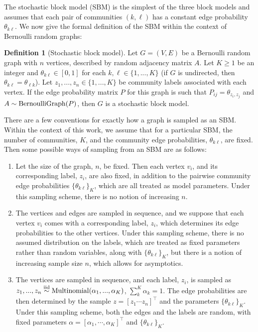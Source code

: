 \documentclass[
  12pt,
]{article}
\theoremstyle{definition}
\newtheorem{definition}{Definition}[section]
\theoremstyle{definition}
\theoremstyle{definition}
\theoremstyle{definition}
\theoremstyle{remark}
\begin{document}
The stochastic block model (SBM) \citep{doi:10.1080/0022250X.1971.9989788} is the simplest of the three block models and assumes that each pair of communities \((k, \ell)\) has a constant edge probability \(\theta_{k \ell}\).
We now give the formal definition of the SBM within the context of Bernoulli random graphs:

\begin{definition}[Stochastic block model]
\label{def:sbm}
Let $G = (V, E)$ be a Bernoulli random graph with $n$ vertices, described by random adjacency matrix $A$. 
Let $K \geq 1$ be an integer and $\theta_{k \ell} \in [0, 1]$ for each $k, \ell \in \{1, ..., K\}$ (if $G$ is undirected, then $\theta_{k \ell} = \theta_{\ell k}$). 
Let $z_1, ..., z_n \in \{1, ..., K\}$ be community labels associated with each vertex. 
If the edge probability matrix $P$ for this graph is such that 
$P_{ij} = \theta_{z_i, z_j}$ and $A \sim \mathrm{BernoulliGraph}(P)$, then $G$ is a stochastic block model. 
\end{definition}

There are a few conventions for exactly how a graph is sampled as an SBM.
Within the context of this work, we assume that for a particular SBM, the number of communities, \(K\), and the community edge probabilities, \(\theta_{k \ell}\), are fixed.
Then some possible ways of sampling from an SBM are as follows:

\begin{enumerate}
\def\labelenumi{\arabic{enumi}.}
\item
  Let the size of the graph, \(n\), be fixed.
  Then each vertex \(v_i\), and its corresponding label, \(z_i\), are also fixed, in addition to the pairwise community edge probabilities \(\{\theta_{k \ell}\}_K\), which are all treated as model parameters.
  Under this sampling scheme, there is no notion of increasing \(n\).
\item
  The vertices and edges are sampled in sequence, and we suppose that each vertex \(v_i\) comes with a corresponding label, \(z_i\), which determines its edge probabilities to the other vertices.
  Under this sampling scheme, there is no assumed distribution on the labels, which are treated as fixed parameters rather than random variables, along with \(\{\theta_{k \ell}\}_K\), but there is a notion of increasing sample size \(n\), which allows for asymptotics.
\item
  The vertices are sampled in sequence, and each label, \(z_i\), is sampled as \(z_1, ..., z_n \stackrel{\mathrm{iid}}{\sim} \mathrm{Multinomial}(\alpha_1, ..., \alpha_K)\), \(\sum_k^K \alpha_k = 1\).
  The edge probabilities are then determined by the sample \(z = [z_1 \cdots z_n]^\top\) and the parameters \(\{\theta_{k \ell}\}_K\).
  Under this sampling scheme, both the edges and the labels are random, with fixed parameters \(\alpha = [ \alpha_1, \cdots, \alpha_K ]^\top\) and \(\{\theta_{k \ell}\}_K\).
\end{enumerate}
\end{document}
